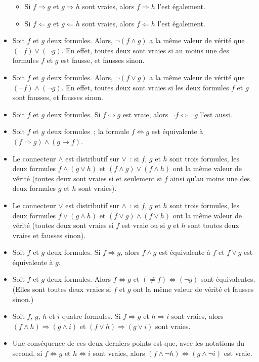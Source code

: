 \begin{itemize}
\begin{itemize}[nosep]
            \item Si $f \Rightarrow g$ et $g \Rightarrow h$ sont vraies, alors $f \Rightarrow h$ l'est également. 
            \item Si $f \Leftarrow g$ et $g \Leftarrow h$ sont vraies, alors $f \Leftarrow h$ l'est également. 
        \end{itemize}
    \item Soit $f$ et $g$ deux formules. Alors, $\neg (f \wedge g)$ a la même valeur de vérité que $(\neg f) \vee (\neg g)$. 
        En effet, toutes deux sont vraies si au moins une des formules $f$ et $g$ est fausse, et fausses sinon.
    \item Soit $f$ et $g$ deux formules. Alors, $\neg (f \vee g)$ a la même valeur de vérité que $(\neg f) \wedge (\neg g)$. 
        En effet, toutes deux sont vraies si les deux formules $f$ et $g$ sont fausses, et fausses sinon.
    \item Soit $f$ et $g$ deux formules. Si $f \Leftrightarrow g$ est vraie, alors $\neg f \Leftrightarrow \neg g$ l'est aussi.
    \item Soit $f$ et $g$ deux formules ; la formule $f \Leftrightarrow g$ est équivalente à $(f \Rightarrow g) \wedge (g \rightarrow f)$. 
    \item Le connecteur $\wedge$ est distributif sur $\vee$ : si $f$, $g$ et $h$ sont trois formules, les deux formules $f \wedge (g \vee h)$ et $(f \wedge g) \vee (f \wedge h)$ ont la même valeur de vérité (toutes deux sont vraies si et seulement si $f$ ainsi qu'au moins une des deux formules $g$ et $h$ sont vraies). 
    \item Le connecteur $\vee$ est distributif sur $\wedge$ : si $f$, $g$ et $h$ sont trois formules, les deux formules $f \vee (g \wedge h)$ et $(f \vee g) \wedge (f \vee h)$ ont la même valeur de vérité (toutes deux sont vraies si $f$ est vraie ou si $g$ et $h$ sont toutes deux vraies et fausses sinon).
    \item Soit $f$ et $g$ deux formules. Si $f \Rightarrow g$, alors $f \wedge g$ est équivalente à $f$ et $f \vee g$ est équivalente à $g$.
    \item Soit $f$ et $g$ deux formules. Alors $f \Leftrightarrow g$ et $(\neq f) \Leftrightarrow (\neg g)$ sont équivalentes. 
        (Elles sont toutes deux vraies si $f$ et $g$ ont la même valeur de vérité et fausses sinon.)
    \item Soit $f$, $g$, $h$ et $i$ quatre formules. 
        Si $f \Rightarrow g$ et $h \Rightarrow i$ sont vraies, alors $(f \wedge h) \Rightarrow (g \wedge i)$ et $(f \vee h) \Rightarrow (g \vee i)$ sont vraies.
    \item Une conséquence de ces deux derniers points est que, avec les notations du second, si $f \Leftrightarrow g$ et $h \Leftrightarrow i$ sont vraies, alors $(f \wedge \neg h) \Leftrightarrow (g \wedge \neg i)$ est vraie.
\end{itemize}

